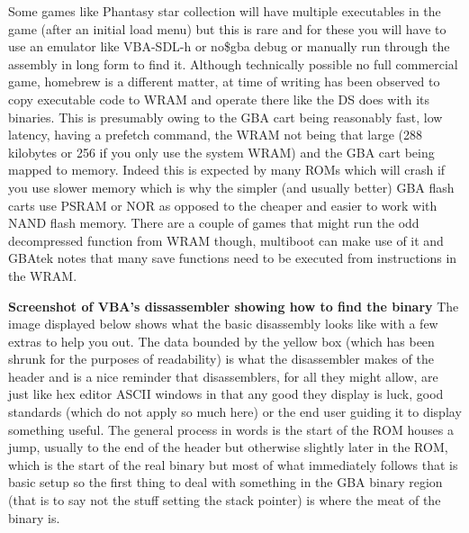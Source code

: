 \documentclass[
]{book}
\begin{document}
Some games like Phantasy star collection will have multiple executables in the game (after an initial load menu) but this is rare and for these you will have to use an emulator like VBA-SDL-h or no\$gba debug or manually run through the assembly in long form to find it. Although technically possible no full commercial game, homebrew is a different matter, at time of writing has been observed to copy executable code to WRAM and operate there like the DS does with its binaries. This is presumably owing to the GBA cart being reasonably fast, low latency, having a prefetch command, the WRAM not being that large (288 kilobytes or 256 if you only use the system WRAM) and the GBA cart being mapped to memory. Indeed this is expected by many ROMs which will crash if you use slower memory which is why the simpler (and usually better) GBA flash carts use PSRAM or NOR as opposed to the cheaper and easier to work with NAND flash memory. There are a couple of games that might run the odd decompressed function from WRAM though, multiboot can make use of it and GBAtek notes that many save functions need to be executed from instructions in the WRAM.

\textbf{Screenshot of VBA's dissassembler showing how to find the binary} The image displayed below shows what the basic disassembly looks like with a few extras to help you out. The data bounded by the yellow box (which has been shrunk for the purposes of readability) is what the disassembler makes of the header and is a nice reminder that disassemblers, for all they might allow, are just like hex editor ASCII windows in that any good they display is luck, good standards (which do not apply so much here) or the end user guiding it to display something useful. The general process in words is the start of the ROM houses a jump, usually to the end of the header but otherwise slightly later in the ROM, which is the start of the real binary but most of what immediately follows that is basic setup so the first thing to deal with something in the GBA binary region (that is to say not the stuff setting the stack pointer) is where the meat of the binary is.
\end{document}
